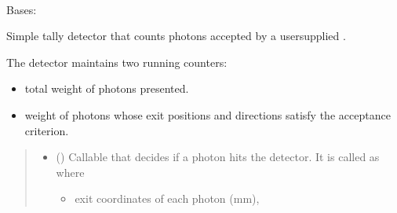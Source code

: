 \documentclass[letterpaper,10pt,english]{sphinxmanual}
\begin{document}
\begin{savenotes}
\begin{longtable}{}
\\
\sphinxbottomrule
\end{longtable}
\sphinxtableafterendhook
\sphinxatlongtableend
\end{savenotes}

\begin{fulllineitems}
\label{\detokenize{generated/photon_canon.optics:photon_canon.optics.Detector}}
\pysigstartsignatures
\pysiglinewithargsret
{}
{\sphinxparamcomma {}\sphinxparamcomma {}\sphinxparamcomma {}\sphinxparamcomma {}}
{}
\pysigstopsignatures
\sphinxAtStartPar
Bases: 

\sphinxAtStartPar
Simple tally detector that counts photons accepted by a user\sphinxhyphen{}supplied
.

\sphinxAtStartPar
The detector maintains two running counters:
\begin{itemize}
\item {} 
\sphinxAtStartPar
{}    \textendash{} total weight of photons presented.

\item {} 
\sphinxAtStartPar
{} \textendash{} weight of photons whose exit positions and
directions satisfy the acceptance criterion.

\end{itemize}
\begin{quote}\begin{description}
\begin{itemize}
\item {} 
\sphinxAtStartPar
{} (\sphinxstyleliteralemphasis{\sphinxupquote{{[}}}\sphinxstyleliteralemphasis{\sphinxupquote{{[}}}\sphinxstyleliteralemphasis{\sphinxupquote{, }}\sphinxstyleliteralemphasis{\sphinxupquote{{]}}}\sphinxstyleliteralemphasis{\sphinxupquote{, }}\sphinxstyleliteralemphasis{\sphinxupquote{{]}}}) \textendash{} 
\sphinxAtStartPar
Callable that decides if a photon hits the detector.
It is called as  where
\begin{itemize}
\item {} 
\sphinxAtStartPar
{} \textendash{} exit coordinates of each photon (mm),


\end{itemize}
\end{itemize}
\end{description}
\end{quote}
\end{fulllineitems}
\end{document}

